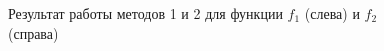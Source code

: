 \documentclass[a4paper]{article}
\begin{document}
\begin{figure}[!h]
\begin{minipage}[h]{0.49\linewidth}
  \end{minipage}
  \caption{Результат работы методов 1 и 2 для функции $f_1$ (слева) и $f_2$ (справа)}
  \label{r1}
\end{figure}
\end{document}
